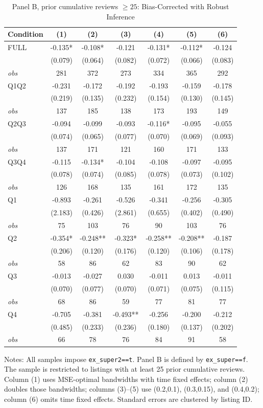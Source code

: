 \begin{table}[!htbp]
\centering
\caption{Panel B, prior cumulative reviews $\geq25$: Bias-Corrected with Robust Inference}
\begin{tabular}{lcccccc}
\toprule
Condition & (1) & (2) & (3) & (4) & (5) & (6) \\
\midrule
FULL & -0.135* & -0.108* & -0.121 & -0.131* & -0.112* & -0.124 \\
 & (0.079) & (0.064) & (0.082) & (0.072) & (0.066) & (0.083) \\
\textit{obs} & 281 & 372 & 273 & 334 & 365 & 292 \\
Q1Q2 & -0.231 & -0.172 & -0.192 & -0.193 & -0.159 & -0.178 \\
 & (0.219) & (0.135) & (0.232) & (0.154) & (0.130) & (0.145) \\
\textit{obs} & 137 & 185 & 138 & 173 & 193 & 149 \\
Q2Q3 & -0.094 & -0.099 & -0.093 & -0.116* & -0.095 & -0.055 \\
 & (0.074) & (0.065) & (0.077) & (0.070) & (0.069) & (0.093) \\
\textit{obs} & 137 & 171 & 121 & 160 & 171 & 133 \\
Q3Q4 & -0.115 & -0.134* & -0.104 & -0.108 & -0.097 & -0.095 \\
 & (0.078) & (0.074) & (0.085) & (0.078) & (0.073) & (0.102) \\
\textit{obs} & 126 & 168 & 135 & 161 & 172 & 135 \\
Q1 & -0.893 & -0.261 & -0.526 & -0.341 & -0.256 & -0.305 \\
 & (2.183) & (0.426) & (2.861) & (0.655) & (0.402) & (0.490) \\
\textit{obs} & 75 & 103 & 76 & 90 & 103 & 76 \\
Q2 & -0.354* & -0.248** & -0.323* & -0.258** & -0.208** & -0.187 \\
 & (0.206) & (0.120) & (0.176) & (0.120) & (0.106) & (0.178) \\
\textit{obs} & 58 & 86 & 62 & 83 & 90 & 62 \\
Q3 & -0.013 & -0.027 & 0.030 & -0.011 & 0.013 & -0.011 \\
 & (0.070) & (0.077) & (0.070) & (0.071) & (0.075) & (0.115) \\
\textit{obs} & 68 & 86 & 59 & 77 & 81 & 77 \\
Q4 & -0.705 & -0.381 & -0.493** & -0.256 & -0.200 & -0.212 \\
 & (0.485) & (0.233) & (0.236) & (0.180) & (0.137) & (0.202) \\
\textit{obs} & 66 & 78 & 76 & 84 & 91 & 58 \\
\bottomrule
\end{tabular}
\begin{minipage}{0.98\textwidth}\footnotesize
Notes: All samples impose \texttt{ex\_super2==t}. Panel B is defined by \texttt{ex\_super==f}. The sample is restricted to listings with at least 25 prior cumulative reviews. Column (1) uses MSE-optimal bandwidths with time fixed effects; column (2) doubles those bandwidths; columns (3)--(5) use (0.2,0.1), (0.3,0.15), and (0.4,0.2); column (6) omits time fixed effects. Standard errors are clustered by listing ID.
\end{minipage}
\end{table}
